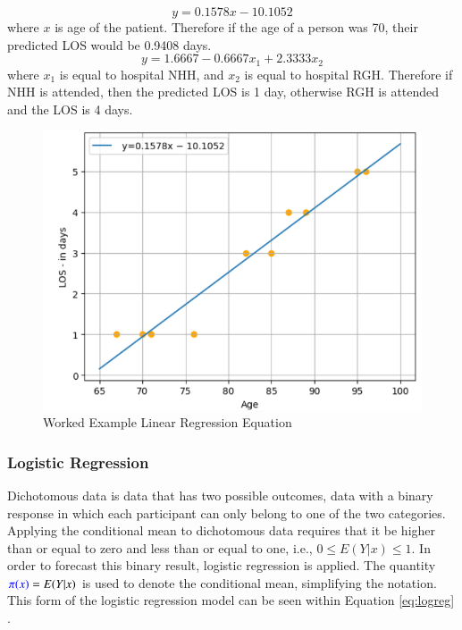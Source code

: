 \documentclass[../thesis.tex]{subfiles}
\begin{document}
\begin{equation}\label{eq:WElin}
    y = 0.1578x -10.1052
\end{equation}
where $x$ is age of the patient. Therefore if the age of a person was 70, their predicted LOS would be 0.9408 days.
\begin{equation}\label{eq:WElog}
    y=1.6667 -0.6667x_{1} +2.3333x_{2}
\end{equation}
where $x_1$ is equal to hospital NHH, and $x_2$ is equal to hospital RGH. Therefore if NHH is attended, then the predicted LOS is 1 day, otherwise RGH is attended and the LOS is 4 days.

\begin{figure}[h!]
    \centering
    \includegraphics[scale=0.7]{Chapters/Chapter3New/Figures/WorkedExampleLinearReg1.png}
    \caption{Worked Example Linear Regression Equation}
    \label{fig:WorkedExampleLinReg}
\end{figure}


\subsubsection{Logistic Regression}
Dichotomous data is data that has two possible outcomes, data with a binary response in which each participant can only belong to one of the two categories. Applying the conditional mean to dichotomous data requires that it be higher than or equal to zero and less than or equal to one, i.e., $ 0 \leq E(Y|x) \leq 1$. In order to forecast this binary result, logistic regression is applied. The quantity $\textcolor{blue}{\pi(x)} = E(Y|x)$ is used to denote the conditional mean, simplifying the notation. This form of the logistic regression model can be seen within Equation \eqref{eq:logreg} \cite{Hosmer1989,Wasserman2004}.
\end{document}
